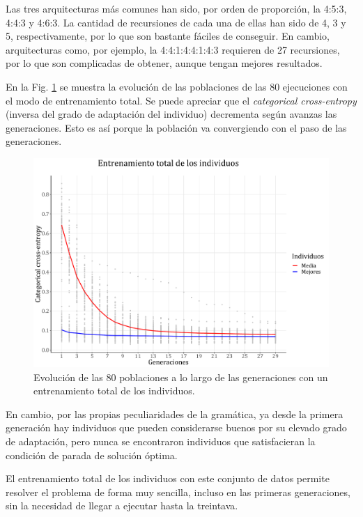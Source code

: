 \documentclass[spanish,a4paper,12pt,twoside]{report}
\begin{document}
  Las tres arquitecturas más comunes han sido, por orden de proporción, la 4:5:3, 4:4:3 y 4:6:3. La cantidad de recursiones de cada una de ellas han sido de 4, 3 y 5, respectivamente, por lo que son bastante fáciles de conseguir. En cambio, arquitecturas como, por ejemplo, la 4:4:1:4:4:1:4:3 requieren de 27 recursiones, por lo que son complicadas de obtener, aunque tengan mejores resultados. \par
  En la Fig. \ref{fig:18} se muestra la evolución de las poblaciones de las 80 ejecuciones con el modo de entrenamiento total. Se puede apreciar que el \emph{categorical cross-entropy} (inversa del grado de adaptación del individuo) decrementa según avanzas las generaciones. Esto es así porque la población va convergiendo con el paso de las generaciones.
  \begin{figure}[H]
    \centering
    \includegraphics[width = 1\textwidth]{resources/Fig18.pdf}
    \caption{Evolución de las 80 poblaciones a lo largo de las generaciones con un entrenamiento total de los individuos.}
    \label{fig:18}
  \end{figure} \par
  En cambio, por las propias peculiaridades de la gramática, ya desde la primera generación hay individuos que pueden considerarse buenos por su elevado grado de adaptación, pero nunca se encontraron individuos que satisfacieran la condición de parada de solución óptima. \par
  El entrenamiento total de los individuos con este conjunto de datos permite resolver el problema de forma muy sencilla, incluso en las primeras generaciones, sin la necesidad de llegar a ejecutar hasta la treintava. \par
\end{document}
